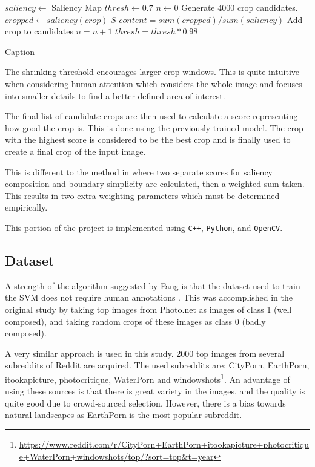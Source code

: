 \begin{algorithm}
\begin{algorithmic}[1]

\State $saliency \gets$ Saliency Map
\State $thresh \gets 0.7$
\State $n \gets 0$
    \Repeat
    \State Generate $4000$ crop candidates.
        \State $cropped \gets saliency(crop)$
        \State $S\_content = sum(cropped) / sum(saliency)$
            \State Add crop to candidates
            \State $n = n + 1$
        \EndIf
    \EndFor
    \State $thresh = thresh * 0.98$
\end{algorithmic}
\caption{Caption \label{alg:autocrop}}
\end{algorithm}

The shrinking threshold encourages larger crop windows.
This is quite intuitive when considering human attention which considers the
whole image and focuses into smaller details to find a better defined area of
interest.

The final list of candidate crops are then used to calculate a score
representing how good the crop is.
This is done using the previously trained model.
The crop with the highest score is considered to be the best crop and is finally
used to create a final crop of the input image.

This is different to the method in \cite{fang2014automatic} where two separate scores for saliency composition and boundary simplicity are calculated, then a weighted sum taken.
This results in two extra weighting parameters which must be determined empirically.

This portion of the project is implemented using \texttt{C++},
\texttt{Python}, and \texttt{OpenCV}.

\subsection{Dataset\label{sec:Cropping_Dataset}}

A strength of the algorithm suggested by Fang is that the dataset used to train
the SVM does not require human annotations \cite{fang2014automatic}.
This was accomplished in the original study by taking top images from Photo.net
as images of class 1 (well composed), and taking random crops of these images as
class 0 (badly composed).

A very similar approach is used in this study.
2000 top images from several subreddits of Reddit are acquired.
The used subreddits are: CityPorn, EarthPorn, itookapicture, photocritique,
WaterPorn and windowshots\footnote{\url{https://www.reddit.com/r/CityPorn+EarthPorn+itookapicture+photocritique+WaterPorn+windowshots/top/?sort=top&t=year}}.
An advantage of using these sources is that there is great variety in the
images, and the quality is quite good due to crowd-sourced selection.
However, there is a bias towards natural landscapes as EarthPorn is the most
popular subreddit.

